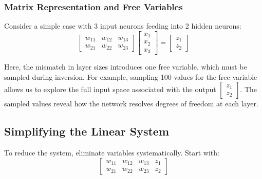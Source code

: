 \documentclass{article}
\begin{document}
\begin{center}
\end{center}

\subsubsection*{Matrix Representation and Free Variables}

Consider a simple case with 3 input neurons feeding into 2 hidden neurons:
\[
\begin{bmatrix}
w_{11} & w_{12} & w_{13} \\
w_{21} & w_{22} & w_{23}
\end{bmatrix}
\begin{bmatrix}
x_1 \\
x_2 \\
x_3
\end{bmatrix}
=
\begin{bmatrix}
z_1 \\
z_2
\end{bmatrix}
\]

Here, the mismatch in layer sizes introduces one free variable, which must be sampled during inversion. For example, sampling 100 values for the free variable allows us to explore the full input space associated with the output \(\begin{bmatrix}z_1 \\ z_2\end{bmatrix}\). The sampled values reveal how the network resolves degrees of freedom at each layer.

\subsection*{Simplifying the Linear System}

To reduce the system, eliminate variables systematically. Start with:
\[
\begin{bmatrix}
w_{11} &w_{12} & w_{13} & z_1 \\
w_{21} & w_{22} & w_{23} & z_2
\end{bmatrix}
\]
\end{document}
